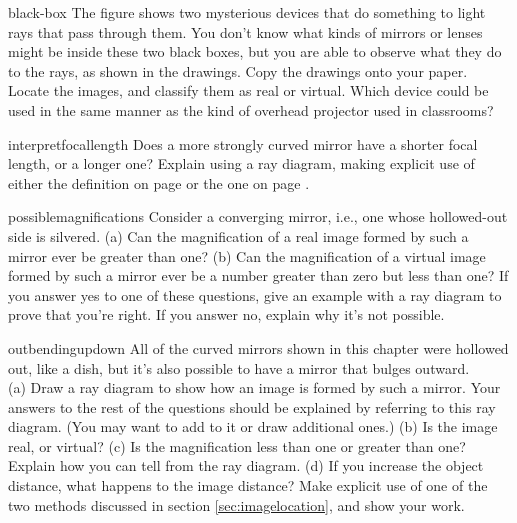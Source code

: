 \begin{hwsection}
\begin{hw}{black-box}
The figure shows two mysterious devices that do something to light rays that pass through them.
You don't know what kinds of mirrors or lenses might be inside these two black boxes, but you
are able to observe what they do to the rays, as shown in the drawings. 
Copy the drawings onto your paper. Locate the images, and classify them as real or virtual. Which
device could be used in the same manner as the kind of overhead projector used in classrooms?
\end{hw}


\begin{hw}{interpretfocallength}
Does a more strongly curved mirror have a shorter focal length, or a longer one? Explain
using a ray diagram,
making explicit use of either the definition on page
\pageref{focal-length-definition} or the one on page \pageref{alt-focal-length-definition}.
\end{hw}

\begin{hw}{possiblemagnifications}
Consider a converging mirror, i.e., one whose hollowed-out side is silvered.
(a) Can the magnification of a real image formed by such a mirror ever be greater than one?\hwendpart
(b) Can the magnification of a virtual image formed by such a mirror ever be a number greater than
zero but less than one?\hwendpart
If you answer yes to one of these questions, give an example with a ray diagram to prove
that you're right. If you answer no, explain why it's not possible.
\end{hw}

\pagebreak[4]

\begin{hw}{outbendingupdown}
All of the curved mirrors shown in this chapter were hollowed out, like a dish,
but it's also possible to have a mirror that bulges outward.\\
(a) Draw a ray diagram to show
how an image is formed by such a mirror. Your answers to the rest of the questions
should be explained by referring to this ray diagram. (You may want to add to it
or draw additional ones.)\hwendpart
(b) Is the image real, or virtual?\hwendpart
(c) Is the magnification less than one or greater than one? Explain how you can tell
from the ray diagram.\hwendpart
(d) If you increase the object distance, what happens to the image distance?
Make explicit use of one of the two methods discussed in section \ref{sec:imagelocation},
and show your work.
\end{hw}


\end{hwsection}
